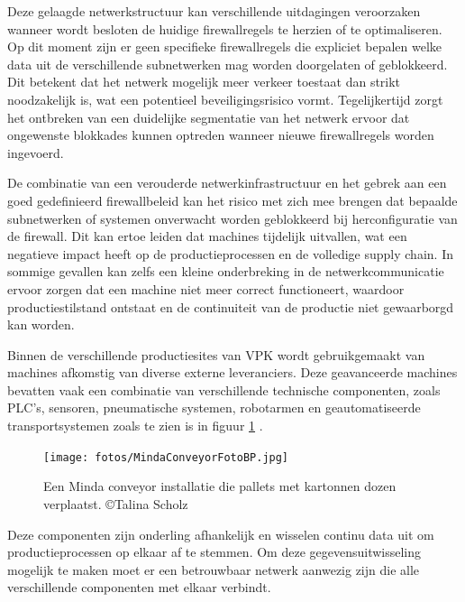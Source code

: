 \vspace{5mm}
Deze gelaagde netwerkstructuur kan verschillende uitdagingen veroorzaken wanneer wordt besloten de huidige firewallregels te herzien of te optimaliseren. Op dit moment zijn er geen specifieke firewallregels die expliciet bepalen welke data uit de verschillende subnetwerken mag worden doorgelaten of geblokkeerd. Dit betekent dat het netwerk mogelijk meer verkeer toestaat dan strikt noodzakelijk is, wat een potentieel beveiligingsrisico vormt. Tegelijkertijd zorgt het ontbreken van een duidelijke segmentatie van het netwerk ervoor dat ongewenste blokkades kunnen optreden wanneer nieuwe firewallregels worden ingevoerd.

\vspace{5mm}
De combinatie van een verouderde netwerkinfrastructuur en het gebrek aan een goed gedefinieerd firewallbeleid kan het risico met zich mee brengen dat bepaalde subnetwerken of systemen onverwacht worden geblokkeerd bij herconfiguratie van de firewall. Dit kan ertoe leiden dat machines tijdelijk uitvallen, wat een negatieve impact heeft op de productieprocessen en de volledige supply chain. In sommige gevallen kan zelfs een kleine onderbreking in de netwerkcommunicatie ervoor zorgen dat een machine niet meer correct functioneert, waardoor productiestilstand ontstaat en de continuiteit van de productie niet gewaarborgd kan worden.

\vspace{5mm}
Binnen de verschillende productiesites van VPK wordt gebruikgemaakt van machines afkomstig van diverse externe leveranciers. Deze geavanceerde machines bevatten vaak een combinatie van verschillende technische componenten, zoals PLC’s, sensoren, pneumatische systemen, robotarmen en geautomatiseerde transportsystemen zoals te zien is in figuur \ref{fig:MindaConveyorFotoBP} . 

\vspace{5mm}
\begin{figure}[H]
    \centering
    \texttt{[image: fotos/MindaConveyorFotoBP.jpg]}
    \caption[Minda Conveyor]{\label{fig:MindaConveyorFotoBP} Een Minda conveyor installatie die pallets met kartonnen dozen verplaatst. ©Talina Scholz}
\end{figure} 
\vspace{5mm}

Deze componenten zijn onderling afhankelijk en wisselen continu data uit om productieprocessen op elkaar af te stemmen. Om deze gegevensuitwisseling mogelijk te maken moet er een betrouwbaar netwerk aanwezig zijn die alle verschillende componenten met elkaar verbindt.

